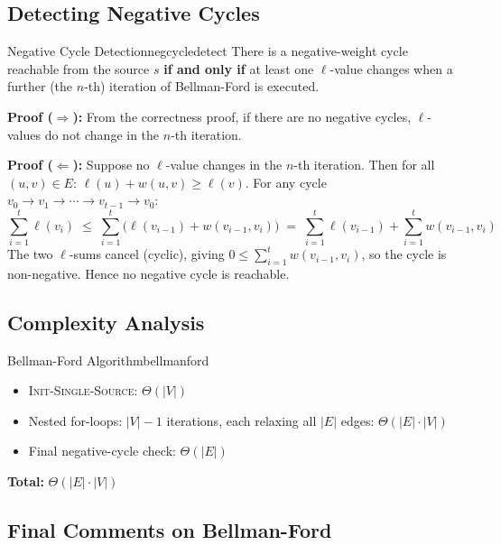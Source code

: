 \subsection{Detecting Negative Cycles}

\begin{theorem}{Negative Cycle Detection}{negcycledetect}
There is a negative-weight cycle reachable from the source $s$ \textbf{if and only if} at
least one $\ell$-value changes when a further (the $n$-th) iteration of Bellman-Ford is
executed.

\textbf{Proof ($\Rightarrow$):} From the correctness proof, if there are no negative cycles,
$\ell$-values do not change in the $n$-th iteration.

\textbf{Proof ($\Leftarrow$):} Suppose no $\ell$-value changes in the $n$-th iteration. Then
for all $(u,v) \in E$: $\ell(u) + w(u,v) \ge \ell(v)$. For any cycle
$v_0 \to v_1 \to \cdots \to v_{t-1} \to v_0$:
\[
  \sum_{i=1}^{t} \ell(v_i) \;\le\; \sum_{i=1}^{t}\bigl(\ell(v_{i-1}) + w(v_{i-1},v_i)\bigr)
  \;=\; \sum_{i=1}^{t}\ell(v_{i-1}) + \sum_{i=1}^{t} w(v_{i-1},v_i)
\]
The two $\ell$-sums cancel (cyclic), giving $0 \le \sum_{i=1}^{t} w(v_{i-1},v_i)$, so the
cycle is non-negative. Hence no negative cycle is reachable.
\end{theorem}

\subsection{Complexity Analysis}

\begin{complexity}{Bellman-Ford Algorithm}{bellmanford}
\begin{itemize}[noitemsep]
  \item \textsc{Init-Single-Source}: $\Theta(|V|)$
  \item Nested for-loops: $|V|-1$ iterations, each relaxing all $|E|$ edges: $\Theta(|E| \cdot |V|)$
  \item Final negative-cycle check: $\Theta(|E|)$
\end{itemize}
\textbf{Total:} $\Theta(|E| \cdot |V|)$
\end{complexity}

\subsection{Final Comments on Bellman-Ford}

